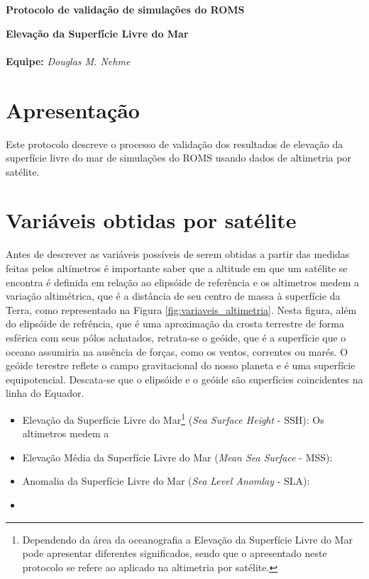 \documentclass[12pt]{article}
\begin{document}
\begin{center}
	{\bf {\Large Protocolo de validação de simulações do ROMS}}
	\vspace{5mm}\par

	{\bf {\large Elevação da Superfície Livre do Mar}}
	\\
	\hrulefill
	\\
	
	{\bf Equipe:} {\it Douglas M. Nehme}\\
	\par
\end{center}

\tableofcontents

\newpage

\section*{Apresentação}
	\par Este protocolo descreve o processo de validação dos resultados de elevação da superfície livre do mar de simulações do ROMS usando dados de altimetria por satélite.
	
\section{Variáveis obtidas por satélite}
	\par Antes de descrever as variáveis possíveis de serem obtidas a partir das medidas feitas pelos altímetros é importante saber que a altitude em que um satélite se encontra é definida em relação ao elipsóide de referência e os altimetros medem a variação altimétrica, que é a distância de seu centro de massa à superfície da Terra, como representado na Figura \ref{fig:variaveis_altimetria}. Nesta figura, além do elipsóide de refrência, que é uma aproximação da crosta terrestre de forma esférica com seus pólos achatados, retrata-se o geóide, que é a superfície que o oceano assumiria na ausência de forças, como os ventos, correntes ou marés. O geóide terestre reflete o campo gravitacional do nosso planeta e é uma superfície equipotencial. Descata-se que o elipsóide e o geóide são superfícies coincidentes na linha do Equador.

	\begin{itemize}
		\item Elevação da Superfície Livre do Mar\footnote[1]{Dependendo da área da oceanografia a Elevação da Superfície Livre do Mar pode apresentar diferentes significados, sendo que o apresentado neste protocolo se refere ao aplicado na altimetria por satélite.} (\textit{Sea Surface Height} - SSH): Os altimetros medem a
		\item Elevação Média da Superfície Livre do Mar (\textit{Mean Sea Surface} - MSS): 
		\item Anomalia da Superfície Livre do Mar (\textit{Sea Level Anomlay} - SLA):
		\item 
	\end{itemize}
\end{document}
